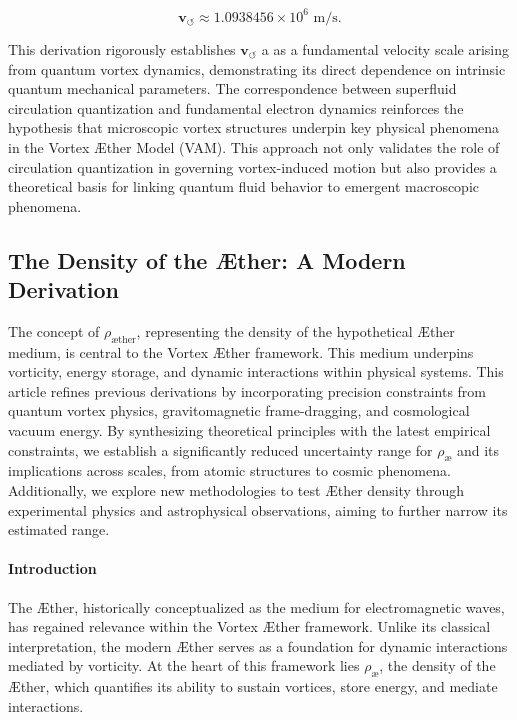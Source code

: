 \documentclass[a4paper,10pt]{article}
\begin{document}
\begin{equation*}
\mathbf{v}_{\scriptscriptstyle\boldsymbol{\circlearrowleft}} \approx 1.0938456 \times 10^6 \text{ m/s}.
\end{equation*}

This derivation rigorously establishes  $ \mathbf{v}_{\scriptscriptstyle\boldsymbol{\circlearrowleft}} $ a as a fundamental velocity scale arising from quantum vortex dynamics, demonstrating its direct
dependence on intrinsic quantum mechanical parameters. The correspondence between superfluid circulation quantization and fundamental electron dynamics reinforces the hypothesis that microscopic vortex structures underpin key physical phenomena in the Vortex Æther Model (VAM). This approach not only validates the role of circulation quantization in governing vortex-induced motion but also provides a theoretical basis for linking quantum fluid behavior to emergent macroscopic phenomena.

    \subsection{The Density of the Æther: A Modern Derivation}
The concept of $\rho_\text{æther}$, representing the density of the hypothetical Æther medium, is central to the Vortex Æther framework. This
medium underpins vorticity, energy storage, and dynamic interactions within physical systems. This article refines previous derivations by incorporating precision constraints from quantum vortex physics, gravitomagnetic frame-dragging, and cosmological vacuum energy. By synthesizing theoretical principles with the latest empirical constraints, we establish a significantly reduced uncertainty range for $\rho_\text{\ae}$ and its implications across scales, from atomic structures to cosmic phenomena. Additionally, we explore new methodologies to test Æther density through experimental physics and astrophysical observations, aiming to further narrow its estimated range.


\paragraph*{Introduction} The Æther, historically conceptualized as the medium for electromagnetic waves, has regained relevance within the Vortex Æther framework. Unlike its classical interpretation, the modern Æther serves as a foundation for dynamic interactions mediated by vorticity. At the heart of this framework lies $\rho_\text{\ae}$, the density of the Æther, which quantifies its ability to sustain vortices, store energy, and mediate interactions.
\end{document}

